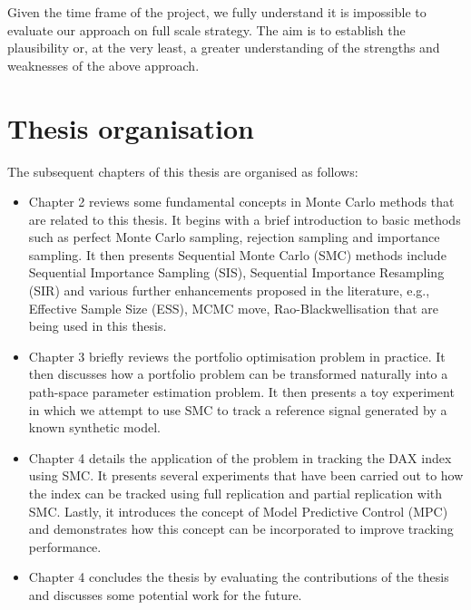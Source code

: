 Given the time frame of the project, we fully understand it is impossible to evaluate our approach on full scale strategy. The aim is to establish the plausibility or, at the very least, a greater understanding of the strengths and weaknesses of the above approach.

\section{Thesis organisation}
The subsequent chapters of this thesis are organised as follows:
\begin{itemize}
\item Chapter 2 reviews some fundamental concepts in Monte Carlo methods that are related to this thesis. It begins with a brief introduction to basic methods such as perfect Monte Carlo sampling, rejection sampling and importance sampling. It then presents Sequential Monte Carlo (SMC) methods include Sequential Importance Sampling (SIS), Sequential Importance Resampling (SIR) and various further enhancements proposed in the literature, e.g., Effective Sample Size (ESS), MCMC move, Rao-Blackwellisation that are being used in this thesis.
\item Chapter 3 briefly reviews the portfolio optimisation problem in practice. It then discusses how a portfolio problem can be transformed naturally into a path-space parameter estimation problem. It then presents a toy experiment in which we attempt to use SMC to track a reference signal generated by a known synthetic model.
\item Chapter 4 details the application of the problem in tracking the DAX index using SMC. It presents several experiments that have been carried out to how the index can be tracked using full replication and partial replication with SMC. Lastly, it introduces the concept of Model Predictive Control (MPC) and demonstrates how this concept can be incorporated to improve tracking performance.
\item Chapter 4 concludes the thesis by evaluating the contributions of the thesis and discusses some potential work for the future.
\end{itemize}



